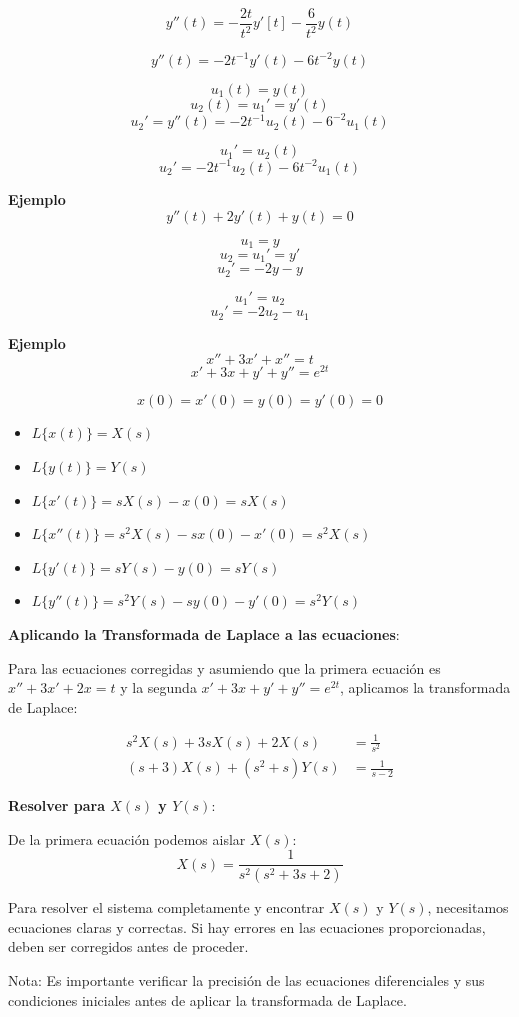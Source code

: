 \documentclass{article}
\begin{document}
\[
    y''(t) = -\frac{2t}{t^2} y'[t]- \frac{6}{t^2}y(t)
\]

\[
    y''(t) = -2t^{-1}y'(t) - 6t^{-2}y(t)
\]

\[u_1(t) = y(t)\]
\[u_2(t) = u_1' = y'(t)\]
\[u_2' = y''(t) = -2t^{-1}u_2(t) - 6^{-2}u_1(t)\]

\[u_1' = u_2(t)\]
\[u_2' = -2t^{-1} u_2(t) - 6t^{-2}u_1(t)\]

\textbf{Ejemplo}
\[y''(t) + 2y'(t) + y(t) = 0\]

\[u_1 = y\]
\[u_2 = u_1' = y'\]
\[u_2' = -2y - y\]

\[u_1' = u_2\]
\[u_2' = -2u_2 - u_1\]

\textbf{Ejemplo}
\[x'' + 3x' + x'' = t\]
\[x' + 3x + y' + y'' = e^{2t}\]

\[x(0) = x'(0) = y(0) = y'(0) = 0\]

\begin{itemize}
    \item $L\{x(t)\} = X(s)$
    \item $L\{y(t)\} = Y(s)$
    \item $L\{x'(t)\} = sX(s) - x(0) = sX(s)$
    \item $L\{x''(t)\} = s^2X(s) - sx(0) - x'(0) = s^2X(s)$
    \item $L\{y'(t)\} = sY(s) - y(0) = sY(s)$
    \item $L\{y''(t)\} = s^2Y(s) - sy(0) - y'(0) = s^2Y(s)$
\end{itemize}

\textbf{Aplicando la Transformada de Laplace a las ecuaciones}:

Para las ecuaciones corregidas y asumiendo que la primera ecuación es $x'' + 3x' + 2x = t$ y la segunda $x' + 3x + y' + y'' = e^{2t}$, aplicamos la transformada de Laplace:

\begin{align}
    s^2X(s) + 3sX(s) + 2X(s)    & = \frac{1}{s^2} \\
    (s + 3)X(s) + (s^2 + s)Y(s) & = \frac{1}{s-2}
\end{align}

\textbf{Resolver para $X(s)$ y $Y(s)$}: 

De la primera ecuación podemos aislar $X(s)$:
\begin{equation}
    X(s) = \frac{1}{s^2(s^2 + 3s + 2)}
\end{equation}

Para resolver el sistema completamente y encontrar $X(s)$ y $Y(s)$, necesitamos ecuaciones claras y correctas. Si hay errores en las ecuaciones proporcionadas, deben ser corregidos antes de proceder.

Nota: Es importante verificar la precisión de las ecuaciones diferenciales y sus condiciones iniciales antes de aplicar la transformada de Laplace.
\end{document}
